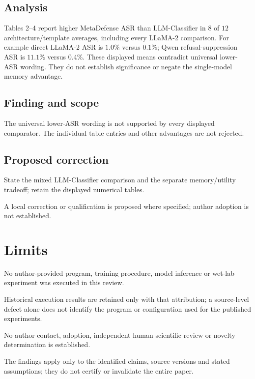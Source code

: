 \documentclass[11pt]{article}
\begin{document}
\subsection*{Analysis}

Tables 2–4 report higher MetaDefense ASR than LLM-Classifier in \(8\) of \(12\) architecture/template averages, including every LLaMA-2 comparison. For example direct LLaMA-2 ASR is \(1.0\%\) versus \(0.1\%\); Qwen refusal-suppression ASR is \(11.1\%\) versus \(0.4\%\). These displayed means contradict universal lower-ASR wording. They do not establish significance or negate the single-model memory advantage.

\subsection*{Finding and scope}

The universal lower-ASR wording is not supported by every displayed comparator. The individual table entries and other advantages are not rejected.

\subsection*{Proposed correction}

State the mixed LLM-Classifier comparison and the separate memory/utility tradeoff; retain the displayed numerical tables.

A local correction or qualification is proposed where specified; author adoption is not established.

\section*{Limits}

No author-provided program, training procedure, model inference or wet-lab experiment was executed in this review.\par

Historical execution results are retained only with that attribution; a source-level defect alone does not identify the program or configuration used for the published experiments.\par

No author contact, adoption, independent human scientific review or novelty determination is established.\par

The findings apply only to the identified claims, source versions and stated assumptions; they do not certify or invalidate the entire paper.\par
\end{document}
